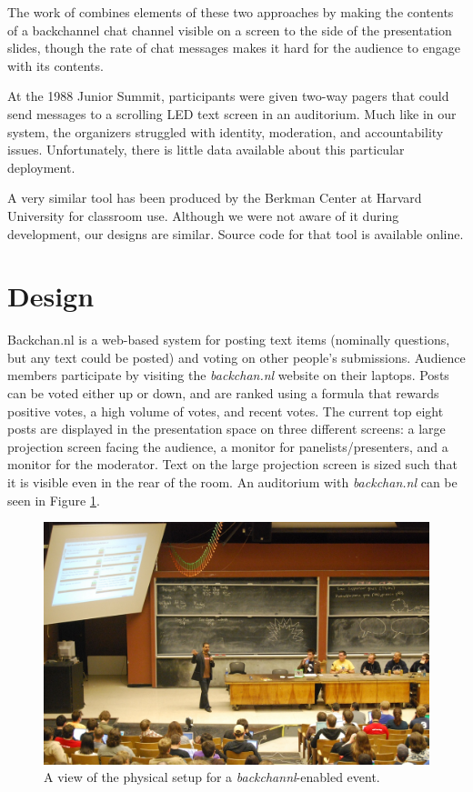 The work of \citet{Rekimoto:1998jy} combines elements of these two approaches by making the contents of a backchannel chat channel visible on a screen to the side of the presentation slides, though the rate of chat messages makes it hard for the audience to engage with its contents. 

At the 1988 Junior Summit, participants were given two-way pagers that could send messages to a scrolling LED text screen in an auditorium. Much like in our system, the organizers struggled with identity, moderation, and accountability issues. Unfortunately, there is little data available about this particular deployment. \citep{Chesnais:uh}

A very similar tool has been produced by the Berkman Center at Harvard University for classroom use. Although we were not aware of it during development, our designs are similar. Source code for that tool is available online. \citep{Anonymous:DYsIxdHV} 


\section{Design}

Backchan.nl is a web-based system for posting text items (nominally questions, but any text could be posted) and voting on other people's submissions. Audience members participate by visiting the \emph{backchan.nl} website on their laptops. Posts can be voted either up or down, and are ranked using a formula that rewards positive votes, a high volume of votes, and recent votes. The current top eight posts are displayed in the presentation space on three different screens: a large projection screen facing the audience, a monitor for panelists/presenters, and a monitor for the moderator. Text on the large projection screen is sized such that it is visible even in the rear of the room. An auditorium with \emph{backchan.nl} can be seen in Figure \ref{fig:backchannl_physical}. 

\begin{figure}[t]
	\includegraphics{figures/backchannl/roflcon_photo.jpg}
	\caption{A view of the physical setup for a \emph{backchannl}-enabled event.}
	\label{fig:backchannl_physical}
\end{figure}

